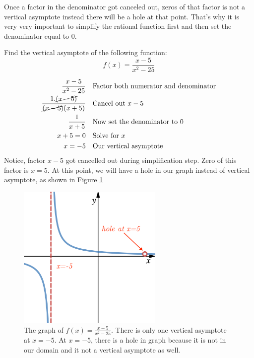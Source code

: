 \begin{nt}
    Once a factor in the denominator got canceled out, zeros of that factor is not a vertical asymptote instead there will be a hole at that point. That's why it is very very important to simplify the rational function first and then set the denominator equal to 0. 
\end{nt}
\begin{exa}
        Find the vertical asymptote of the following function:
        \begin{equation*}
             f(x) = \frac{x-5}{x^2-25}
        \end{equation*}
\end{exa}
\begin{align*}
    \frac{x-5}{x^2-25} &        &   &\text{Factor both numerator and denominator}\\
    \frac{1.\cancel{(x-5)}}{\cancel{(x-5)}(x+5)}&     &   &\text{Cancel out $x-5$}\\
    \frac{1}{x+5}&      &   &\text{Now set the denominator to 0}\\
    x+5=0&      &   &\text{Solve for $x$}\\
    x = -5&     &   &\text{Our vertical asymptote}
\end{align*}
Notice, factor $x-5$ got cancelled out during simplification step. Zero of this factor is $x=5$. At this point, we will have a hole in our graph instead of vertical asymptote, as shown in Figure \ref{fig:ex_2}
\begin{figure}[ht]
    \centering
    \includegraphics[width=7cm]{pics/ex2.png}
    \caption{The graph of $f(x)=\frac{x-5}{x^2-25}$. There is only one vertical asymptote at $x=-5$. At $x=-5$, there is a hole in graph because it is not in our domain and it not a vertical asymptote as well.}
    \label{fig:ex_2}
\end{figure}
